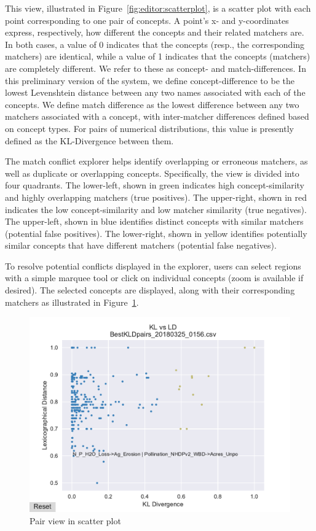 This view, illustrated in Figure~\ref{fig:editor:scatterplot}, is a scatter plot with each point corresponding to one pair of concepts.
A point's x- and y-coordinates express, respectively, how different the concepts and their related matchers are.
In both cases, a value of 0 indicates that the concepts (resp., the corresponding matchers) are identical, while a value of 1 indicates that the concepts (matchers) are completely different.
We refer to these as concept- and match-differences.
In this preliminary version of the system, we define concept-difference to be the lowest Levenshtein distance between any two names associated with each of the concepts.
We define match difference as the lowest difference between any two matchers associated with a concept, with inter-matcher differences defined based on concept types.
For pairs of numerical distributions, this value is presently defined as the KL-Divergence between them.

The match conflict explorer helps identify overlapping or erroneous matchers, as well as duplicate or overlapping concepts.
Specifically, the view is divided into four quadrants.  The lower-left, shown in green indicates high concept-similarity and highly overlapping matchers (true positives).  
The upper-right, shown in red indicates the low concept-similarity and low matcher similarity (true negatives).
The upper-left, shown in blue identifies distinct concepts with similar matchers (potential false positives).  
The lower-right, shown in yellow identifies potentially similar concepts that have different matchers (potential false negatives).

To resolve potential conflicts displayed in the explorer, users can select regions with a simple marquee tool or click on individual concepts (zoom is available if desired).
The selected concepts are displayed, along with their corresponding matchers as illustrated in Figure~\ref{fig:pairview}.

\begin{figure}
	\centering
	\includegraphics[trim={0 0 0 15mm},clip,width=\columnwidth]{graphics/Pair_view_data_callouts}
	\caption{Pair view in scatter plot}
	\label{fig:pairview}
	\trimfigurespacing
\end{figure}


